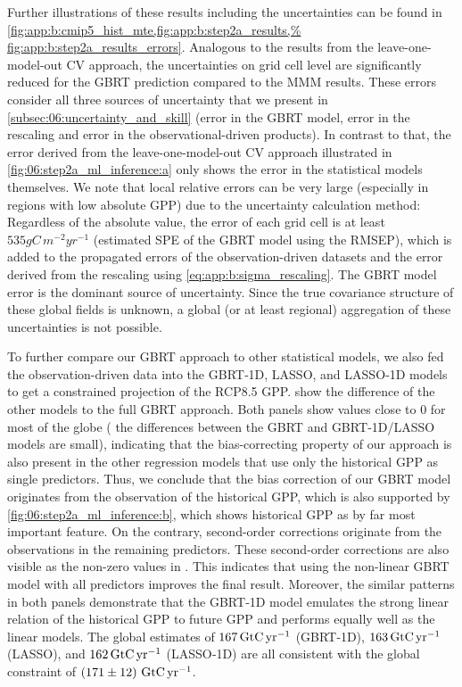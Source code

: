Further illustrations of these results including the uncertainties can be found
in \cref{fig:app:b:cmip5_hist_mte,fig:app:b:step2a_results,%
  fig:app:b:step2a_results_errors}. Analogous to the results from the
leave-one-model-out \ac{CV} approach, the uncertainties on grid cell level
are significantly reduced for the \ac{GBRT} prediction compared to the
\ac{MMM} results. These errors consider all three sources of uncertainty that
we present in \cref{subsec:06:uncertainty_and_skill} (error in the \ac{GBRT}
model, error in the rescaling and error in the observational-driven
products). In contrast to that, the error derived from the
leave-one-model-out \ac{CV} approach illustrated in
\cref{fig:06:step2a_ml_inference:a} only shows the error in the statistical
models themselves. We note that local relative errors can be very large
(especially in regions with low absolute \ac{GPP}) due to the uncertainty
calculation method: Regardless of the absolute value, the error of each grid
cell is at least $535 \unit{gC \, m^{-2} yr^{-1}}$ (estimated \ac{SPE} of the
\ac{GBRT} model using the \ac{RMSEP}), which is added to the propagated
errors of the observation-driven datasets and the error derived from the
rescaling using \cref{eq:app:b:sigma_rescaling}. The \ac{GBRT} model error is
the dominant source of uncertainty. Since the true covariance structure of
these global fields is unknown, a global (or at least regional) aggregation
of these uncertainties is not possible.

To further compare our \ac{GBRT} approach to other statistical models, we also
fed the observation-driven data into the \acs{GBRT}‐1D, \ac{LASSO}, and
\acs{LASSO}‐1D models to get a constrained projection of the \acs{RCP}8.5
\ac{GPP}. 
show the difference of the other models to the full \ac{GBRT} approach. Both
panels show values close to $0$ for most of the globe (\ie{} the differences
between the \ac{GBRT} and \acs{GBRT}‐1D/\ac{LASSO} models are small),
indicating that the bias-correcting property of our approach is also present in
the other regression models that use only the historical \ac{GPP} as single
predictors. Thus, we conclude that the bias correction of our \ac{GBRT} model
originates from the observation of the historical \ac{GPP}, which is also
supported by \cref{fig:06:step2a_ml_inference:b}, which shows historical
\ac{GPP} as by far most important feature. On the contrary, second-order
corrections originate from the observations in the remaining predictors. These
second-order corrections are also visible as the non-zero values in
. This
indicates that using the non-linear \ac{GBRT} model with all predictors
improves the final result. Moreover, the similar patterns in both panels
demonstrate that the \acs{GBRT}‐1D model emulates the strong linear relation of
the historical \ac{GPP} to future \ac{GPP} and performs equally well as the
linear models. The global estimates of $167 \unit{\GtCyr{}}$ (\acs{GBRT}‐1D),
$163 \unit{\GtCyr{}}$ (\ac{LASSO}), and $162 \unit{\GtCyr{}}$ (\acs{LASSO}‐1D)
are all consistent with the global constraint of
$\pmrangeunit{171}{12}{\GtCyr{}}$.


